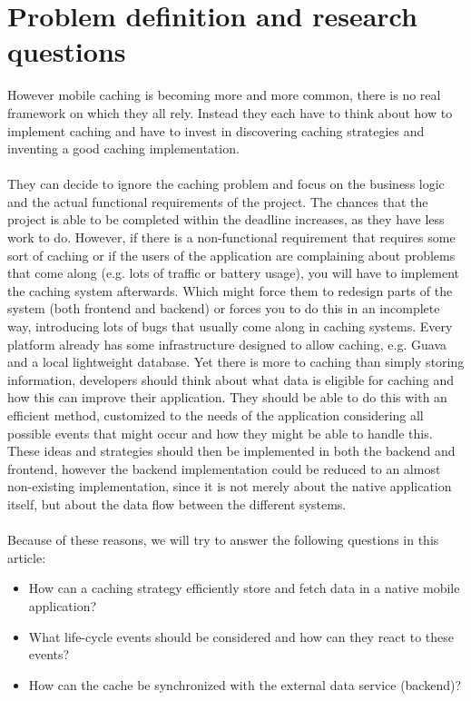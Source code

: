 \documentclass[pdftex,a4paper,12pt,twoside]{report}
\begin{document}
\section{Problem definition and research questions}
However mobile caching is becoming more and more common, there is no real framework on which they all rely. Instead they each have to think about how to implement
caching and have to invest in discovering caching strategies and inventing a good caching implementation.
\\\\
They can decide to ignore the caching problem and focus on the business logic and the actual functional requirements of the project. The chances that the
project is able to be completed within the deadline increases, as they have less work to do. However, if there is a non-functional requirement that requires some sort of caching
or if the users of the application are complaining about problems that come along (e.g. lots of traffic or battery usage), you will have to implement the caching system afterwards. Which might force them to redesign parts of the system (both frontend and backend) or forces you to do this in an incomplete way, introducing lots of bugs that usually come along in caching systems.
\label{sec:research questions}
Every platform already has some infrastructure designed to allow caching, e.g. Guava and a local lightweight database.
Yet there is more to caching than simply storing information, developers should think about what data is eligible for caching and how this can improve their application.
They should be able to do this with an efficient method, customized to the needs of the application considering all possible events that might occur and how they might be able to handle this. These ideas and strategies should then be implemented in both the backend and frontend, however the backend implementation could be reduced to an almost non-existing implementation, since it is not merely about the native application itself, but about the data flow between the different systems.
\\\\Because of these reasons, we will try to answer the following questions in this article:
\begin{itemize}
\item How can a caching strategy efficiently store and fetch data in a native mobile application?
\item What life-cycle events should be considered and how can they react to these events?
\item How can the cache be synchronized with the external data service (backend)?
\end{itemize}
\end{document}
